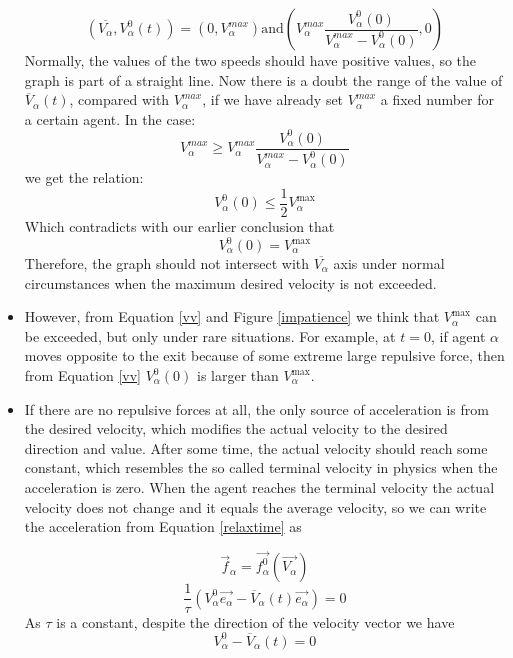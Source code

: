 \begin{itemize}
\begin{equation}
\left( 
	\overline{V_{\alpha}} , V_{\alpha}^{0} \left( t \right)
\right)
=
\left( 
	0 
		, 
	V_{\alpha}^{max} 
\right) 
\text{and} 
\left(
	V_{\alpha}^{max} 
		\frac{V_{\alpha}^{0} \left( 0 \right) }{V_{\alpha}^{max}-V_{\alpha}^{0} \left(0 \right)} 
	, 0 
\right) 
\end{equation}
Normally, the values of the two speeds should have positive values, so the graph is part of a straight line.
Now there is a doubt the range of the value of $ \overline{V}_{\alpha} \left( t \right) $, compared with $ V_{\alpha}^{max} $, 
if we have already 
set $ V_{\alpha}^{max} $ a fixed number for a certain agent. In the case:
\begin{equation}
	V_{\alpha}^{max} 
	\geq 
	V_{\alpha}^{max} 
	\frac{V_{\alpha}^{0}(0)}{V_{\alpha}^{max}-V_{\alpha}^{0}(0)}
\end{equation}
we get the relation:
\begin{equation}
V_{\alpha}^{0}(0)\leq \frac{1}{2} V_{\alpha}^{\text{max}}
\end{equation}
Which contradicts with our earlier conclusion that
\begin{equation}
    V_{\alpha}^{0}\left( 0 \right) = V_{\alpha}^{\text{max}}
\end{equation}
Therefore, the graph should not intersect with $ \overline{V_{\alpha}} $ axis under normal circumstances when the maximum desired velocity is not exceeded.
\item However, from Equation \ref{vv}  and Figure \ref{impatience} we think that $V_{\alpha}^{\text{max}}$ can be exceeded, but only under rare situations. For example, at $ t=0 $, if agent $ \alpha $ moves opposite to the exit because of some extreme large repulsive force, then from Equation \ref{vv} $ V_{\alpha}^{0} \left( 0 \right)  $ is larger than $V_{\alpha}^{\text{max}}$.
\item If there are no repulsive forces at all, the only source of acceleration is from the desired velocity, which modifies the actual velocity to the desired direction and value.  After some time, the actual velocity should reach some constant, which resembles the so called terminal velocity in physics when the acceleration is zero.  When the agent reaches the terminal velocity the actual velocity does not change and it equals the average velocity, so we can write the acceleration from Equation \ref{relaxtime} as

\begin{equation}
\vec{f}_{\alpha} = \vec{f^{0}_{\alpha}}\left( \vec{V_{\alpha}} \right)
\end{equation}
\begin{equation}
\frac{1}{\tau}\left( V_{\alpha}^{0} \vec{e_{\alpha}} - \overline{V}_{\alpha} \left( t\right) \vec{e_{\alpha}}  \right)  = 0
\end{equation}
As $ \tau $ is a constant, despite the direction of the velocity vector we have
\begin{equation}\label{terminal}
	 V_{\alpha}^{0} - \overline{V}_{\alpha} \left( t\right) 
    = 0
\end{equation}


\end{itemize}
